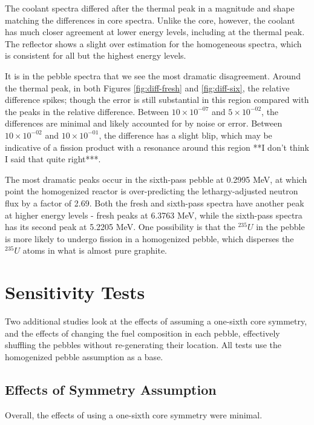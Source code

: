 The coolant spectra differed after the thermal peak in a magnitude and shape matching the differences in core spectra.  Unlike the core, however, the coolant has much closer agreement at lower energy levels, including at the thermal peak.  The reflector shows a slight over estimation for the homogeneous spectra, which is consistent for all but the highest energy levels.

It is in the pebble spectra that we see the most dramatic disagreement.  Around the thermal peak, in both Figures \ref{fig:diff-fresh} and \ref{fig:diff-six}, the relative difference spikes; though the error is still substantial in this region compared with the peaks in the relative difference.  Between $10\times10^{-07}$ and $5\times10^{-02}$, the differences are minimal and likely accounted for by noise or error.  Between $10\times10^{-02}$ and $10\times10^{-01}$, the difference has a slight blip, which may be indicative of a fission product with a resonance around this region **I don't think I said that quite right***.

The most dramatic peaks occur in the sixth-pass pebble at 0.2995 MeV, at which point the homogenized reactor is over-predicting the lethargy-adjusted neutron flux by a factor of 2.69.  Both the fresh and sixth-pass spectra have another peak at higher energy levels - fresh peaks at 6.3763 MeV, while the sixth-pass spectra has its second peak at 5.2205 MeV.  One possibility is that the $^{235}U$ in the pebble is more likely to undergo fission in a homogenized pebble, which disperses the $^{235}U$ atoms in what is almost pure graphite.



\section{Sensitivity Tests}
Two additional studies look at the effects of assuming a one-sixth core symmetry, and the effects of changing the fuel composition in each pebble, effectively shuffling the pebbles without re-generating their location.  All tests use the homogenized pebble assumption as a base.

\subsection{Effects of Symmetry Assumption}

Overall, the effects of using a one-sixth core symmetry were minimal.




